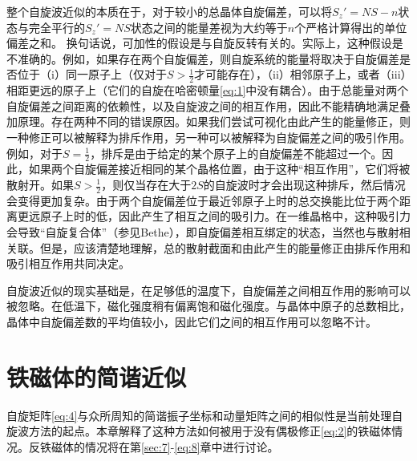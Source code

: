 \documentclass{article}
\begin{document}
整个自旋波近似的本质在于，对于较小的总晶体自旋偏差，可以将$S_z'=NS-n$状态与完全平行的$S_z'=NS$状态之间的能量差视为大约等于$n$个严格计算得出的单位偏差之和。
换句话说，可加性的假设是与自旋反转有关的。实际上，这种假设是不准确的。例如，如果存在两个自旋偏差，则自旋系统的能量将取决于自旋偏差是否位于（i）同一原子上（仅对于$S>\frac{1}{2}$才可能存在），（ii）相邻原子上，或者（iii）相距更远的原子上（它们的自旋在哈密顿量\eqref{eq:1}中没有耦合）。由于总能量对两个自旋偏差之间距离的依赖性，以及自旋波之间的相互作用，因此不能精确地满足叠加原理。存在两种不同的错误原因。如果我们尝试可视化由此产生的能量修正，则一种修正可以被解释为排斥作用，另一种可以被解释为自旋偏差之间的吸引作用。例如，对于$S=\frac{1}{2}$，排斥是由于给定的某个原子上的自旋偏差不能超过一个。因此，如果两个自旋偏差接近相同的某个晶格位置，由于这种“相互作用”，它们将被散射开。如果$S>\frac{1}{2}$，则仅当存在大于$2S$的自旋波时才会出现这种排斥，然后情况会变得更加复杂。由于两个自旋偏差位于最近邻原子上时的总交换能比位于两个距离更远原子上时的低，因此产生了相互之间的吸引力。在一维晶格中，这种吸引力会导致“自旋复合体”（参见Bethe），即自旋偏差相互绑定的状态，当然也与散射相关联。但是，应该清楚地理解，总的散射截面和由此产生的能量修正由排斥作用和吸引相互作用共同决定。

自旋波近似的现实基础是，在足够低的温度下，自旋偏差之间相互作用的影响可以被忽略。在低温下，磁化强度稍有偏离饱和磁化强度。与晶体中原子的总数相比，晶体中自旋偏差数的平均值较小，因此它们之间的相互作用可以忽略不计。




\section{铁磁体的简谐近似} \label{sec:3}

自旋矩阵\eqref{eq:4}与众所周知的简谐振子坐标和动量矩阵之间的相似性是当前处理自旋波方法的起点。本章解释了这种方法如何被用于没有偶极修正\eqref{eq:2}的铁磁体情况。反铁磁体的情况将在第\ref{sec:7}-\ref{eq:8}章中进行讨论。
\end{document}
